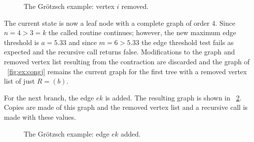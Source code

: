 \begin{figure}[H]
  \centering
  \caption{The Gr\"otzsch example: vertex \(i\) removed.}
  \label{fig:ex:remi}
\end{figure}

The current state is now a leaf node with a complete graph of order 4.  Since \(n=4>3=k\) the called routine
continues; however, the new maximum edge threshold is \(a=5.33\) and since \(m=6>5.33\) the edge threshold test
fails as expected and the recursive call returns false.  Modifications to the graph and removed vertex list
resulting from the contraction are discarded and the graph of \figurename~\ref{fig:ex:congj} remains the current graph
for the first tree with a removed vertex list of just \(R=(b)\).

For the next branch, the edge \(ek\) is added.  The resulting graph is shown in \figurename~\ref{fig:ex:addek}.
Copies are made of this graph and the removed vertex list and a recursive call is made with these values.

\begin{figure}[H]
  \centering
  \caption{The Gr\"otzsch example: edge \(ek\) added.}
  \label{fig:ex:addek}
\end{figure}

